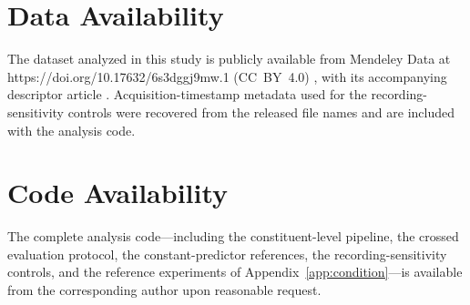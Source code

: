 
\section*{Data Availability}
The dataset analyzed in this study is publicly available from Mendeley Data
at \mbox{https://doi.org/10.17632/6s3dggj9mw.1} (CC~BY~4.0)
\cite{mcc5motor_data}, with its accompanying descriptor article
\cite{chen2026}. Acquisition-timestamp metadata used for the
recording-sensitivity controls were recovered from the released file names
and are included with the analysis code.

\section*{Code Availability}
The complete analysis code---including the constituent-level pipeline, the
crossed evaluation protocol, the constant-predictor references, the
recording-sensitivity controls, and the reference experiments of
Appendix~\ref{app:condition}---is available from the corresponding author
upon reasonable request.
